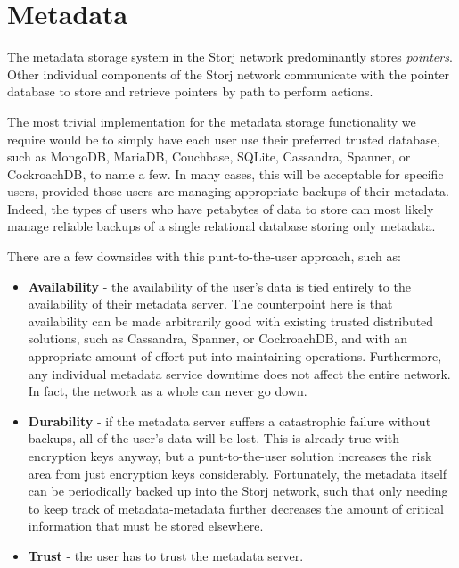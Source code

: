 \documentclass[11pt,fleqn,openany]{book}
\begin{document}
\section{Metadata}\label{sec:concrete-metadata}

The metadata storage system in the Storj network predominantly stores
{\em pointers}. Other individual components of the Storj network communicate with
the pointer database to store and retrieve pointers by path to perform actions.

The most trivial implementation for the metadata storage functionality we
require would be to simply have each user use their preferred trusted database,
such as MongoDB, MariaDB, Couchbase, SQLite, Cassandra\cite{cassandra},
Spanner\cite{spanner}, or CockroachDB, to name a few. In many cases, this will
be acceptable for specific users, provided those users are managing appropriate
backups of their metadata. Indeed, the types of users who have petabytes of data
to store can most likely manage reliable backups of a single relational database
storing only metadata.

There are a few downsides with this punt-to-the-user approach, such as:
\begin{itemize}
\item {\bf Availability} - the availability of the user's data
is tied entirely to the availability of their metadata server. The counterpoint
here is that availability can be made arbitrarily good with existing trusted
distributed solutions, such as Cassandra, Spanner, or CockroachDB, and with an
appropriate amount of effort put into maintaining operations. Furthermore, any
individual metadata service downtime does not affect the entire network. In
fact, the network as a whole can never go down.
\item {\bf Durability} -
if the metadata server suffers a catastrophic failure without backups, all of
the user's data will be lost. This is already true with encryption keys anyway,
but a punt-to-the-user solution increases the risk area from just encryption
keys considerably. Fortunately, the metadata itself can be periodically backed
up into the Storj network,
such that only needing to keep track of metadata-metadata
further decreases the amount of critical information that must be stored
elsewhere.
\item {\bf Trust} - the user has to trust the metadata server.
\end{itemize}
\end{document}
